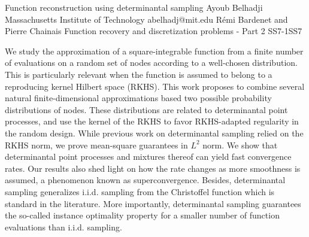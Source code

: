 \begin{talk}
  {Function reconstruction using determinantal sampling}%
  {Ayoub Belhadji}%
  {Massachusetts Institute of Technology}%
  {abelhadj@mit.edu}%
  {Rémi Bardenet and Pierre Chainais}%
{Function recovery and discretization problems - Part 2}
{}{SS7-1}{SS7}

			
We study the approximation of a square-integrable function from a finite number of evaluations on a random set of nodes according to a well-chosen distribution. This is particularly relevant when the function is assumed to belong to a reproducing kernel Hilbert space (RKHS). This work proposes to combine several natural finite-dimensional approximations based two possible probability distributions of nodes. These distributions are related to determinantal point processes, and use the kernel of the RKHS to favor RKHS-adapted regularity in the random design. While previous work on determinantal sampling relied on the RKHS norm, we prove mean-square guarantees in $L^2$ norm. We show that determinantal point processes and mixtures thereof can yield fast convergence rates. Our results also shed light on how the rate changes as more smoothness is assumed, a phenomenon known as superconvergence. Besides, determinantal sampling generalizes i.i.d. sampling from the Christoffel function which is standard in the literature. More importantly, determinantal sampling guarantees the so-called instance optimality property for a smaller number of function evaluations than i.i.d. sampling.

\medskip


\end{talk}

